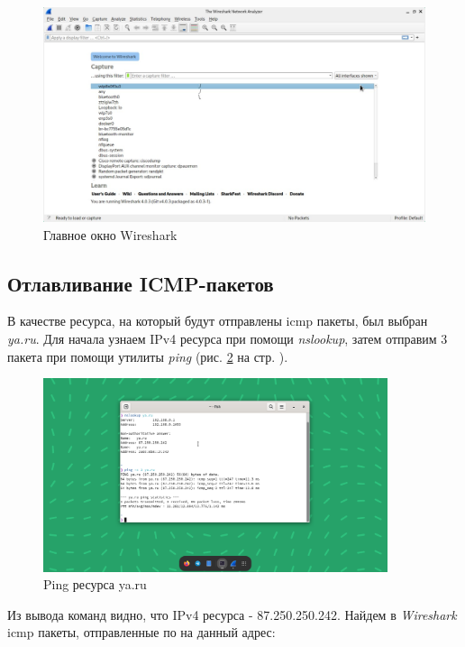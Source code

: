 \documentclass[a4paper]{article}
\begin{document}
  \begin{figure}[H]
    \centering
    \includegraphics[width=1.0\textwidth]{01_0004}
    \caption{Главное окно Wireshark}
    \label{img:0004}
  \end{figure}

  \subsection{Отлавливание ICMP-пакетов}

  В качестве ресурса, на который будут отправлены icmp пакеты, был выбран \textit{ya.ru}.
  Для начала узнаем IPv4 ресурса при помощи \textit{nslookup}, затем отправим 3 пакета при 
  помощи утилиты \textit{ping} (рис. \ref{img:0005} на стр. \pageref{img:0005}).

  \begin{figure}[H]
    \centering
    \includegraphics[width=0.9\textwidth]{01_0005}
    \caption{Ping ресурса ya.ru}
    \label{img:0005}
  \end{figure}

  Из вывода команд видно, что IPv4 ресурса - 87.250.250.242. Найдем в \textit{Wireshark}
  icmp пакеты, отправленные по на данный адрес:
\end{document}
